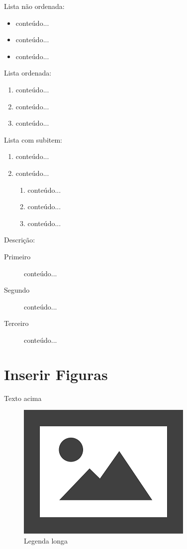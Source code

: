 \documentclass[12pt]{article}
\begin{document}
Lista não ordenada:

\begin{itemize}
	\item conteúdo...
	\item conteúdo...
	\item conteúdo...
\end{itemize}

Lista ordenada:
\begin{enumerate}
	\item conteúdo...
	\item conteúdo...
	\item conteúdo...
\end{enumerate}

Lista com subitem:
\begin{enumerate}
	\item conteúdo...
	\item conteúdo...
	\begin{enumerate}
		\item conteúdo...
		\item conteúdo...
		\item conteúdo...
	\end{enumerate}
\end{enumerate}

Descrição:
\begin{description}
	\item[Primeiro] conteúdo...
	\item[Segundo] conteúdo...
	\item[Terceiro] conteúdo...
\end{description}

\newpage
\section{Inserir Figuras}

Texto acima

\begin{figure}[H]
	\centering
	\includegraphics[width=0.7\linewidth]{Figuras/fig3}
	\caption[Legenda curta]{Legenda longa}
	\label{fig:figura genérica}
\end{figure}
\end{document}
